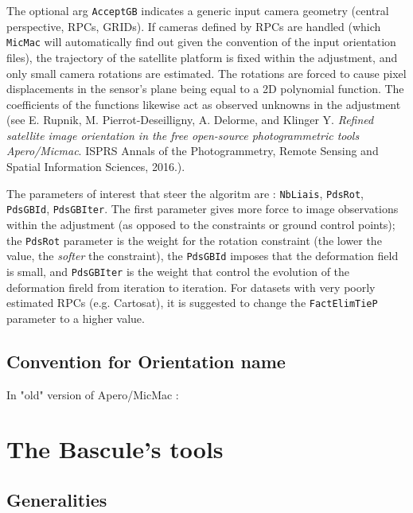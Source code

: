 The optional arg \texttt{AcceptGB} indicates a generic input camera geometry (central perspective, RPCs, GRIDs). If cameras defined by RPCs are handled (which \texttt{MicMac} will automatically find out given the convention of the input orientation files), the trajectory of the satellite platform is fixed within the adjustment, and only small camera rotations are estimated. The rotations are forced to cause pixel displacements in the sensor's plane being equal to a 2D polynomial function. The coefficients of the functions likewise act as observed unknowns in the adjustment (see E. Rupnik, M. Pierrot-Deseilligny, A. Delorme, and Klinger Y. \textit{Refined satellite image orientation in the free open-source photogrammetric tools Apero/Micmac}. ISPRS Annals of the Photogrammetry, Remote Sensing and Spatial Information Sciences, 2016.).\par  
%
The parameters of interest that steer the algoritm are : {\tt{NbLiais}}, {\tt{PdsRot}}, {\tt{PdsGBId}}, {\tt{PdsGBIter}}. The first parameter gives more force to image observations within the adjustment (as opposed to the constraints or ground control points); the {\tt{PdsRot}} parameter is the weight for the rotation constraint (the lower the value, the \textit{softer} the constraint), the {\tt{PdsGBId}} imposes that the deformation field is small, and {\tt{PdsGBIter}} is the weight that control the evolution of the deformation fireld from iteration to iteration. For datasets with very poorly estimated RPCs (e.g. Cartosat), it is suggested to change the {\tt{FactElimTieP}} parameter to a higher value. 
%
\subsection{Convention for Orientation name}

In "old" version of Apero/MicMac :


\section{The Bascule's tools}

\subsection{Generalities}

